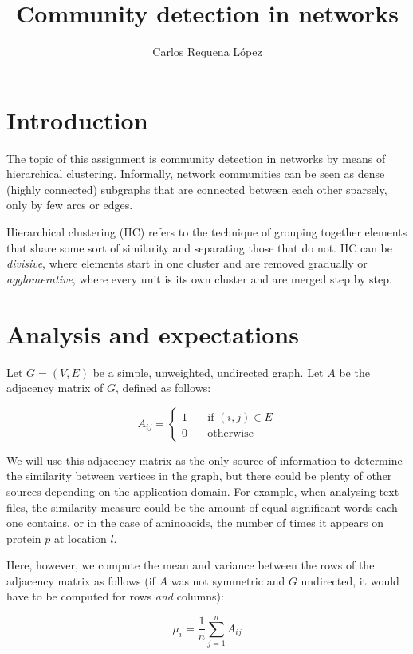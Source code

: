 \documentclass[12pt,a4paper]{article}
\title{Community detection in networks}
\author{Carlos Requena López}
\begin{document}
\thispagestyle{fancy}
\maketitle
\thispagestyle{fancy}

\section{Introduction}

The topic of this assignment is community detection in networks by
means of hierarchical clustering. Informally, network communities can
be seen as dense (highly connected) subgraphs that are connected
between each other sparsely, only by few arcs or edges.

Hierarchical clustering (HC) refers to the technique of grouping
together elements that share some sort of similarity and separating
those that do not. HC can be \emph{divisive}, where elements start in
one cluster and are removed gradually or \emph{agglomerative}, where
every unit is its own cluster and are merged step by step.

\section{Analysis and expectations}

Let $ G = (V, E) $ be a simple, unweighted, undirected graph. Let $A$
be the adjacency matrix of $G$, defined as follows:

\[
  A_{ij} =
  \begin{cases}
    1 & \quad \text{if } (i,j) \in E\\
    0 & \quad \text{otherwise }
  \end{cases}
\]

We will use this adjacency matrix as the only source of information to
determine the similarity between vertices in the graph, but there
could be plenty of other sources depending on the application
domain. For example, when analysing text files, the similarity measure
could be the amount of equal significant words each one contains, or
in the case of aminoacids, the number of times it appears on protein
$p$ at location $l$.

Here, however, we compute the mean and variance between the rows of
the adjacency matrix as follows (if $A$ was not symmetric and $G$
undirected, it would have to be computed for rows \emph{and} columns):

$$ \mu_i = \frac{1}{n} \sum_{j=1}^{n} A_{ij} $$
\end{document}
